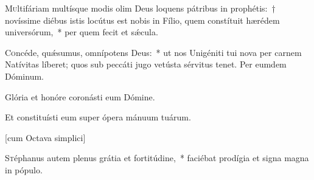 \documentclass[vesperale_romanum.tex]{subfiles}
\begin{document}
\lettrine{M}{u}ltifáriam multísque modis olim Deus loquens pátribus in prophétis:~† novíssime diébus istis locútus est nobis in Fílio, quem constítuit hærédem universórum,~* per quem fecit et sǽcula.


\label{versiculus_ii_vesperis_nativitatis_domini} 
{}


\admagnificat \label{hodie_christus_natus_est} 
{}

\oratio \label{or_natitivatis_dom} 


\lettrine{C}{o}ncéde, quǽsumus, omnípotens Deus:~* ut nos Unigéniti tui nova per carnem Natívitas líberet; quos sub peccáti jugo vetústa sérvitus tenet.
Per eumdem Dóminum.




\vv Glória et honóre coronásti eum Dómine.

\rr Et constituísti eum super ópera mánuum tuárum.


 \label{dec_26}


[cum Octava simplici]



\lettrine{S}{t}éphanus autem plenus grátia et fortitúdine,~* faciébat prodígia et signa magna in pópulo.

\label{deus_tuorum_militum_nat} \hymnus
\end{document}
